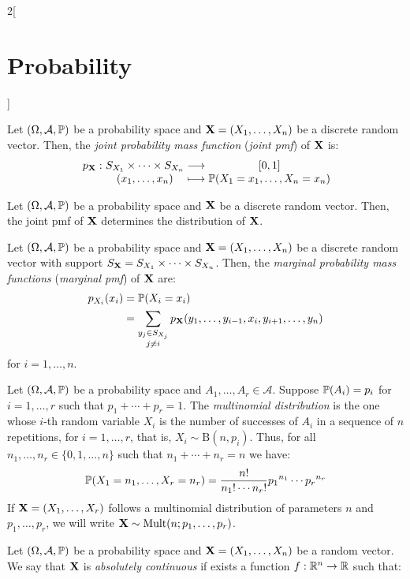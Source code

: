 \documentclass[../../../main.tex]{subfiles}
\begin{document}
\begin{multicols}{2}[\section{Probability}]
\begin{proposition}
  \end{proposition}
  \begin{definition}
    Let $(\Omega,\mathcal{A},\mathbb{P})$ be a probability space and $\boldsymbol{\mathrm{X}}=(X_1,\ldots,X_n)$ be a discrete random vector. Then, the \emph{joint probability mass function} (\emph{joint pmf}) of $\boldsymbol{\mathrm{X}}$ is:
    $$
      \function{p_{\vf{X}}}{S_{X_1}\times\cdots\times S_{X_n}}{[0,1]}{(x_1,\ldots,x_n)}{\Prob(X_1=x_1,\ldots,X_n=x_n)}
    $$
  \end{definition}
  \begin{proposition}
    Let $(\Omega,\mathcal{A},\mathbb{P})$ be a probability space and $\boldsymbol{\mathrm{X}}$ be a discrete random vector. Then, the joint pmf of $\boldsymbol{\mathrm{X}}$ determines the distribution of $\boldsymbol{\mathrm{X}}$.
  \end{proposition}
  \begin{definition}
    Let $(\Omega,\mathcal{A},\mathbb{P})$ be a probability space and $\boldsymbol{\mathrm{X}}=(X_1,\ldots,X_n)$ be a discrete random vector with support $S_{\boldsymbol{\mathrm{X}}}=S_{X_1}\times\cdots\times S_{X_n}$. Then, the \emph{marginal probability mass functions} (\emph{marginal pmf}) of $\boldsymbol{\mathrm{X}}$ are:
    \begin{align*}
      p_{X_i}(x_i) & =\mathbb{P}(X_i=x_i)                 \\
                   & =\sum_{\substack{y_j\in S_{X_j} \\j\ne i}}p_{\boldsymbol{\mathrm{X}}}(y_1,\ldots,y_{i-1},x_i,y_{i+1},\ldots,y_n)
    \end{align*}
    for $i=1,\ldots,n$.
  \end{definition}
  \begin{definition}
    Let $(\Omega,\mathcal{A},\mathbb{P})$ be a probability space and $A_1,\ldots,A_r\in\mathcal{A}$. Suppose $\mathbb{P}(A_i)=p_i$ for $i=1,\ldots,r$ such that $p_1+\cdots+p_r=1$. The \emph{multinomial distribution} is the one whose $i$-th random variable $X_i$ is the number of successes of $A_i$ in a sequence of $n$ repetitions, for $i=1,\ldots,r$, that is, $X_i\sim\text{B}(n,p_i)$. Thus, for all $n_1,\ldots,n_r\in\{0,1,\ldots,n\}$ such that $n_1+\cdots+n_r=n$ we have: $$\mathbb{P}(X_1=n_1,\ldots,X_r=n_r)=\frac{n!}{n_1!\cdots n_r!} {p_1}^{n_1}\cdots{p_r}^{n_r}$$ If $\boldsymbol{\mathrm{X}}=(X_1,\ldots,X_r)$ follows a multinomial distribution of parameters $n$ and $p_1,\ldots,p_r$, we will write $\boldsymbol{\mathrm{X}}\sim \text{Mult}(n;p_1,\ldots,p_r)$.
  \end{definition}
  \begin{definition}
    Let $(\Omega,\mathcal{A},\mathbb{P})$ be a probability space and $\boldsymbol{\mathrm{X}}=(X_1,\ldots,X_n)$ be a random vector. We say that $\boldsymbol{\mathrm{X}}$ is \emph{absolutely continuous} if exists a function $f:\mathbb{R}^n\rightarrow\mathbb{R}$ such that:

\end{definition}
\end{multicols}
\end{document}
